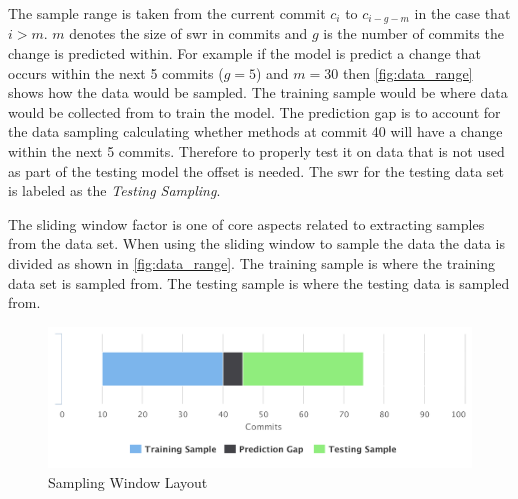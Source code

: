 

The sample range is taken from the current commit $c_i$ to $c_{i-g-m}$ in the case that $i > m$. $m$ denotes the size of \gls{swr} in commits and $g$ is the number of commits the change is predicted within. For example if the model is predict a change that occurs within the next 5 commits ($g = 5$) and $m = 30$ then \autoref{fig:data_range} shows how the data would be sampled. The training sample would be where data would be collected from to train the model. The prediction gap is to account for the data sampling calculating whether methods at commit 40 will have a change within the next 5 commits. Therefore to properly test it on data that is not used as part of the testing model the offset is needed. The \gls{swr} for the testing data set is labeled as the \textit{Testing Sampling}.


The sliding window factor is one of core aspects related to extracting samples from the data set. When using the sliding window to sample the data the data is divided as shown in \autoref{fig:data_range}. The training sample is where the training data set is sampled from. The testing sample is where the testing data is sampled from. 

\begin{figure}[!ht]
    \centering
        \includegraphics[width=1.0\textwidth]{images/exp_data_range}
    \caption{Sampling Window Layout}
    \label{fig:data_range}
\end{figure}



